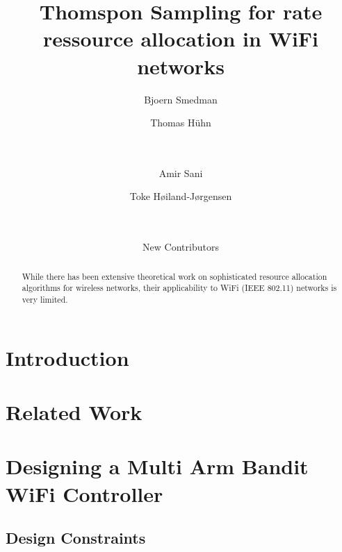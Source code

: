 \documentclass{sig-alternate}
\begin{document}
	\title{Thomspon Sampling for rate ressource allocation in WiFi networks}
	\subtitle{}
	\author{
		\alignauthor
		Bjoern Smedman\\
		\and
		\alignauthor
		Thomas H{\"u}hn\\
	    		\\
			\\
		\and
		\alignauthor
		Amir Sani\\
		\and
		Toke Høiland-Jørgensen\\
	    		\\
			\\
		\and
		\alignauthor
		New Contributors\\
	}

	\maketitle
	\sloppy

	\begin{abstract}
	While there has been extensive theoretical work on sophisticated
	resource allocation algorithms for wireless networks, their applicability
	to WiFi (IEEE 802.11) networks is very limited.
	\end{abstract}


	\section{Introduction}
	\label{s:intro}


	\section{Related Work}
	\label{s:related}


	\section{Designing a Multi Arm Bandit WiFi Controller}
	\label{s:design}

	\subsection{Design Constraints}
	\label{s:constraints}
\end{document}
